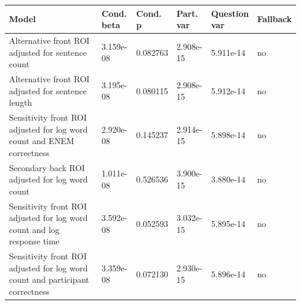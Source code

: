 \begin{tabular}{p{0.40\linewidth}p{0.12\linewidth}p{0.10\linewidth}p{0.12\linewidth}p{0.14\linewidth}p{0.08\linewidth}}
\toprule
Model & Cond. beta & Cond. p & Part. var & Question var & Fallback\\
\midrule
Alternative front ROI adjusted for sentence count & 3.159e-08 & 0.082763 & 2.908e-15 & 5.911e-14 & no\\
Alternative front ROI adjusted for sentence length & 3.195e-08 & 0.080115 & 2.908e-15 & 5.912e-14 & no\\
Sensitivity front ROI adjusted for log word count and ENEM correctness & 2.920e-08 & 0.145237 & 2.914e-15 & 5.898e-14 & no\\
Secondary back ROI adjusted for log word count & 1.011e-08 & 0.526536 & 3.900e-15 & 3.880e-14 & no\\
Sensitivity front ROI adjusted for log word count and log response time & 3.592e-08 & 0.052593 & 3.032e-15 & 5.895e-14 & no\\
Sensitivity front ROI adjusted for log word count and participant correctness & 3.359e-08 & 0.072130 & 2.930e-15 & 5.896e-14 & no\\
\bottomrule
\end{tabular}
